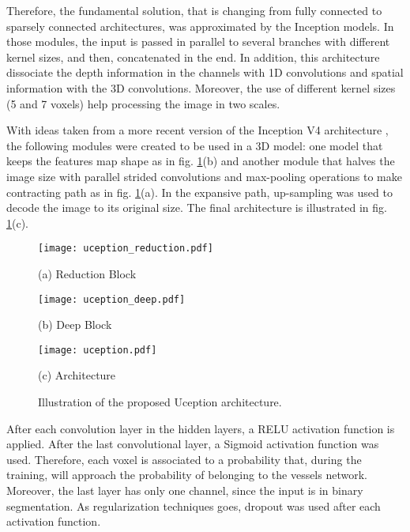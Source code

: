 \documentclass{article}
\begin{document}
Therefore, the fundamental solution, that is changing from fully connected to sparsely connected architectures, was approximated by the Inception models. In those modules, the input is passed in parallel to several branches with different kernel sizes, and then, concatenated in the end. In addition, this architecture dissociate the depth information in the channels with 1D convolutions and spatial information with the 3D convolutions. Moreover, the use of different kernel sizes (5 and 7 voxels) help processing the image in two scales.

With ideas taken from a more recent version of the Inception V4 architecture \cite{Szegedy2016}, the following modules were created to be used in a 3D model: one model that keeps the features map shape as in fig. \ref{fig:uception}(b) and another module that halves the image size with parallel strided convolutions and max-pooling operations to make contracting path as in fig. \ref{fig:uception}(a). In the expansive path, up-sampling was used to decode the image to its original size. The final architecture is illustrated in fig. \ref{fig:uception}(c).

\begin{figure}[htb]

\begin{minipage}[t]{.48\linewidth}
  \texttt{[image: uception\_reduction.pdf]}
  \centerline{(a) Reduction Block}\medskip
\end{minipage}
\begin{minipage}[t]{0.48\linewidth}
  \texttt{[image: uception\_deep.pdf]}
  \centerline{(b) Deep Block}\medskip
\end{minipage}
\begin{minipage}[t]{0.9\linewidth}
\texttt{[image: uception.pdf]}
\centerline{(c) Architecture}\medskip
\end{minipage}
\caption{Illustration of the proposed Uception architecture.}
\label{fig:uception}

\end{figure}


After each convolution layer in the hidden layers, a RELU activation function is applied. After the last convolutional layer, a Sigmoid  activation function was used. Therefore, each voxel is associated to a probability that, during the training, will approach the probability of belonging to the vessels network. Moreover, the last layer has only one channel, since the input is in binary segmentation. As regularization techniques goes, dropout was used after each activation function.
\end{document}
